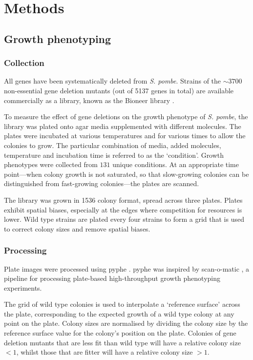 \section{Methods}

\subsection{Growth phenotyping}
\label{sec:methods-gp}

\subsubsection{Collection}

All genes have been systematically deleted from \emph{S. pombe}. Strains of the $\sim \num{3700}$ non-essential gene deletion mutants (out of \num{5137} genes in total) are available commercially as a library, known as the Bioneer library \cite{Kim2010}.

To measure the effect of gene deletions on the growth phenotype of \emph{S. pombe}, the library was plated onto agar media supplemented with different molecules. The plates were incubated at various temperatures and for various times to allow the colonies to grow. The particular combination of media, added molecules, temperature and incubation time is referred to as the `condition'. Growth phenotypes were collected from $131$ unique conditions. At an appropriate time point---when colony growth is not saturated, so that slow-growing colonies can be distinguished from fast-growing colonies---the plates are scanned.

The library was grown in \num{1536} colony format, spread across three plates. Plates exhibit spatial biases, especially at the edges where competition for resources is lower. Wild type strains are plated every four strains to form a grid that is used to correct colony sizes and remove spatial biases.

\subsubsection{Processing}

Plate images were processed using pyphe \cite{Kamrad2020}. pyphe was inspired by scan-o-matic \cite{Zackrisson2016}, a pipeline for processing plate-based high-throughput growth phenotyping experiments.

The grid of wild type colonies is used to interpolate a `reference surface' across the plate, corresponding to the expected growth of a wild type colony at any point on the plate. Colony sizes are normalised by dividing the colony size by the reference surface value for the colony's position on the plate. Colonies of gene deletion mutants that are less fit than wild type will have a relative colony size $<1$, whilst those that are fitter will have a relative colony size $>1$.


